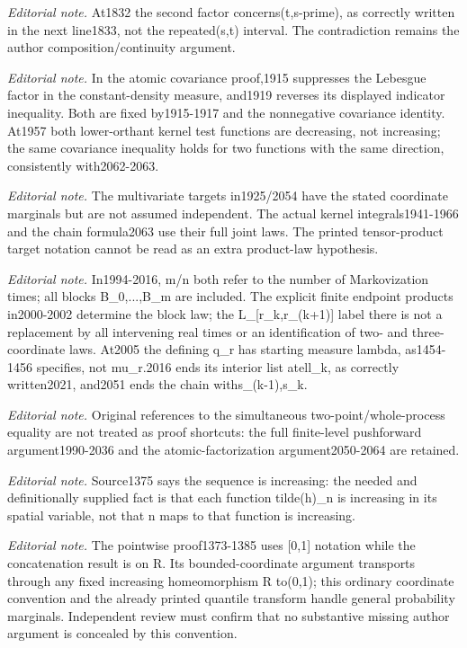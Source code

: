 \documentclass[10pt,a4paper]{article}
\theoremstyle{plain}
\theoremstyle{definition}
\begin{document}
\noindent\textit{Editorial note.} At1832 the second factor concerns(t,s-prime), as correctly written in the next line1833, not the repeated(s,t) interval. The contradiction remains the author composition/continuity argument.\par\medskip
\noindent\textit{Editorial note.} In the atomic covariance proof,1915 suppresses the Lebesgue factor in the constant-density measure, and1919 reverses its displayed indicator inequality. Both are fixed by1915-1917 and the nonnegative covariance identity. At1957 both lower-orthant kernel test functions are decreasing, not increasing; the same covariance inequality holds for two functions with the same direction, consistently with2062-2063.\par\medskip
\noindent\textit{Editorial note.} The multivariate targets in1925/2054 have the stated coordinate marginals but are not assumed independent. The actual kernel integrals1941-1966 and the chain formula2063 use their full joint laws. The printed tensor-product target notation cannot be read as an extra product-law hypothesis.\par\medskip
\noindent\textit{Editorial note.} In1994-2016, m/n both refer to the number of Markovization times; all blocks B\_0,...,B\_m are included. The explicit finite endpoint products in2000-2002 determine the block law; the L\_[r\_k,r\_(k+1)] label there is not a replacement by all intervening real times or an identification of two- and three-coordinate laws. At2005 the defining q\_r has starting measure lambda, as1454-1456 specifies, not mu\_r.2016 ends its interior list atell\_k, as correctly written2021, and2051 ends the chain withs\_(k-1),s\_k.\par\medskip
\noindent\textit{Editorial note.} Original references to the simultaneous two-point/whole-process equality are not treated as proof shortcuts: the full finite-level pushforward argument1990-2036 and the atomic-factorization argument2050-2064 are retained.\par\medskip
\noindent\textit{Editorial note.} Source1375 says the sequence is increasing: the needed and definitionally supplied fact is that each function tilde(h)\_n is increasing in its spatial variable, not that n maps to that function is increasing.\par\medskip
\noindent\textit{Editorial note.} The pointwise proof1373-1385 uses [0,1] notation while the concatenation result is on R. Its bounded-coordinate argument transports through any fixed increasing homeomorphism R to(0,1); this ordinary coordinate convention and the already printed quantile transform handle general probability marginals. Independent review must confirm that no substantive missing author argument is concealed by this convention.\par\medskip
\end{document}
